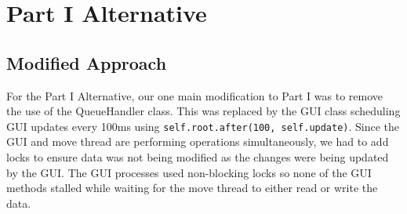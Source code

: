 \documentclass{article}
\begin{document}
\section{Part I Alternative}

\subsection{Modified Approach}
For the Part I Alternative, our one main modification to Part I was to remove the use of the QueueHandler class. This was replaced by the GUI class scheduling GUI updates every 100ms using \texttt{self.root.after(100, self.update)}. Since the GUI and move thread are performing operations simultaneously, we had to add locks to ensure data was not being modified as the changes were being updated by the GUI. The GUI processes used non-blocking locks so none of the GUI methods stalled while waiting for the move thread to either read or write the data.
\end{document}
